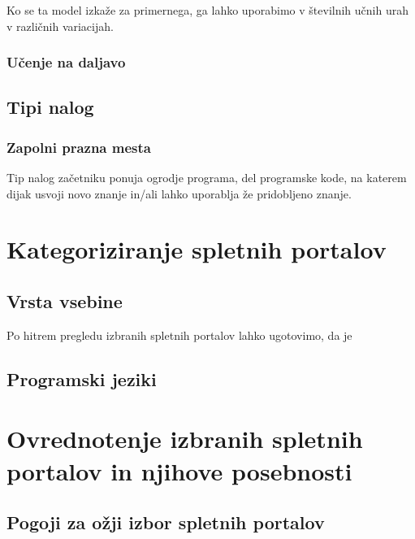 Ko se ta model izkaže za primernega, ga lahko uporabimo v številnih
učnih urah v različnih variacijah.

\subsubsection{Učenje  na daljavo}
\label{sec:Učenje_na_daljavo}


\subsection{Tipi nalog}
\label{tipi_nalog}

\subsubsection{Zapolni prazna mesta}
\label{sec:zapolni_prazna_mesta}

Tip nalog začetniku ponuja ogrodje programa, del programske kode, na
katerem dijak usvoji novo znanje in/ali lahko uporablja že pridobljeno
znanje.


\section{Kategoriziranje spletnih portalov}
\label{sec:kategoriziranje_spletnih_portalov}

\subsection{Vrsta vsebine}
\label{sec:Razvrstitev_spletnih_portalov}

Po hitrem pregledu izbranih spletnih portalov lahko ugotovimo, da je

\subsection{Programski jeziki}
\label{sec:programski_jeziki}


\section{Ovrednotenje izbranih spletnih portalov in njihove posebnosti}
\label{sec:pregled_spletnih_portalov}

\subsection{Pogoji za ožji izbor spletnih portalov}
\label{sec:pogoji_za_ožji_izbor_sp}



